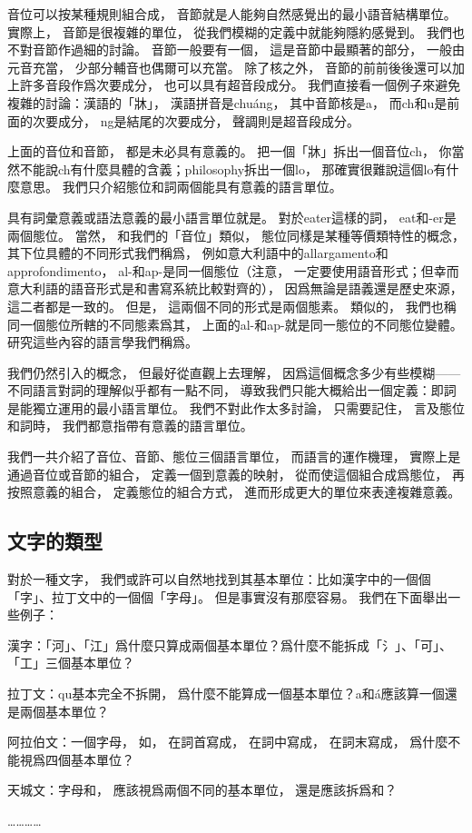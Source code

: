 音位可以按某種規則組合成，
音節就是人能夠自然感覺出的最小語音結構單位。
實際上，
音節是很複雜的單位，
從我們模糊的定義中就能夠隱約感覺到。
我們也不對音節作過細的討論。
音節一般要有一個，
這是音節中最顯著的部分，
一般由元音充當，
少部分輔音也偶爾可以充當。
除了核之外，
音節的前前後後還可以加上許多音段作爲次要成分，
也可以具有超音段成分。
我們直接看一個例子來避免複雜的討論：漢語的「牀」，
漢語拼音是chuáng，
其中音節核是a，
而ch和u是前面的次要成分，
ng是結尾的次要成分，
聲調則是超音段成分。

上面的音位和音節，
都是未必具有意義的。
把一個「牀」拆出一個音位ch，
你當然不能說ch有什麼具體的含義；philosophy拆出一個lo，
那確實很難說這個lo有什麼意思。
我們只介紹態位和詞兩個能具有意義的語言單位。

具有詞彙意義或語法意義的最小語言單位就是。
對於eater這樣的詞，
eat和-er是兩個態位。
當然，
和我們的「音位」類似，
態位同樣是某種等價類特性的概念，
其下位具體的不同形式我們稱爲，
例如意大利語中的allargamento和approfondimento，
al-和ap-是同一個態位（注意，
一定要使用語音形式；但幸而意大利語的語音形式是和書寫系統比較對齊的），
因爲無論是語義還是歷史來源，
這二者都是一致的。
但是，
這兩個不同的形式是兩個態素。
類似的，
我們也稱同一個態位所轄的不同態素爲其，
上面的al-和ap-就是同一態位的不同態位變體。
研究這些內容的語言學我們稱爲。

我們仍然引入的概念，
但最好從直觀上去理解，
因爲這個概念多少有些模糊——不同語言對詞的理解似乎都有一點不同，
導致我們只能大概給出一個定義：即詞是能獨立運用的最小語言單位。
我們不對此作太多討論，
只需要記住，
言及態位和詞時，
我們都意指帶有意義的語言單位。

我們一共介紹了音位、音節、態位三個語言單位，
而語言的運作機理，
實際上是通過音位或音節的組合，
定義一個到意義的映射，
從而使這個組合成爲態位，
再按照意義的組合，
定義態位的組合方式，
進而形成更大的單位來表達複雜意義。



\subsection{文字的類型}
對於一種文字，
我們或許可以自然地找到其基本單位：比如漢字中的一個個「字」、拉丁文中的一個個「字母」。
但是事實沒有那麼容易。
我們在下面舉出一些例子：

\begin{ExampleBlock}
漢字：「河」、「江」爲什麼只算成兩個基本單位？爲什麼不能拆成「氵」、「可」、「工」三個基本單位？

拉丁文：qu基本完全不拆開，
爲什麼不能算成一個基本單位？a和á應該算一個還是兩個基本單位？

阿拉伯文：一個字母，
如，
在詞首寫成，
在詞中寫成，
在詞末寫成，
爲什麼不能視爲四個基本單位？

天城文：字母和，
應該視爲兩個不同的基本單位，
還是應該拆爲和？

…………
\end{ExampleBlock}

